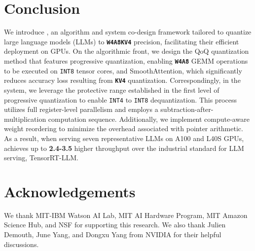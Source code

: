 
\section{Conclusion}

We introduce \system, an algorithm and system co-design framework tailored to quantize large language models (LLMs) to \textbf{\texttt{W4A8KV4}} precision, facilitating their efficient deployment on GPUs. On the algorithmic front, we design the QoQ quantization method that features progressive quantization, enabling \textbf{\texttt{W4A8}} GEMM operations to be executed on \texttt{INT8} tensor cores, and SmoothAttention, which significantly reduces accuracy loss resulting from \textbf{\texttt{KV4}} quantization. Correspondingly, in the \system system, we leverage the protective range established in the first level of progressive quantization to enable \texttt{INT4} to \texttt{INT8} dequantization. This process utilizes full register-level parallelism and employs a subtraction-after-multiplication computation sequence. Additionally, we implement compute-aware weight reordering to minimize the overhead associated with pointer arithmetic. As a result, when serving seven representative LLMs on A100 and L40S GPUs, \system achieves up to \textbf{2.4-3.5\x} higher throughput over the industrial standard for LLM serving, TensorRT-LLM.

\vspace{-5pt}
\section*{Acknowledgements}
We thank MIT-IBM Watson AI Lab, MIT AI Hardware Program, MIT Amazon Science Hub, and NSF for supporting this research. We also thank Julien Demouth, June Yang, and Dongxu Yang from NVIDIA for their helpful discussions. 
